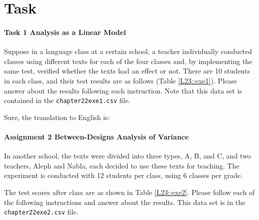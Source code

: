 \documentclass{ltjbook}
\begin{document}
\section{Task}
\paragraph{Task 1 Analysis as a Linear Model}
Suppose in a language class at a certain school, a teacher individually conducted classes using different texts for each of the four classes and, by implementing the same test, verified whether the texts had an effect or not.
There are 10 students in each class, and their test results are as follows (Table \ref{L23::exe1}). Please answer about the results following each instruction. Note that this data set is contained in the \texttt{chapter22exe1.csv} file.




Sure, the translation to English is:

\paragraph{Assignment 2 Between-Designs Analysis of Variance}
In another school, the texts were divided into three types, A, B, and C, and two teachers, Aleph and Nabla, each decided to use these texts for teaching. The experiment is conducted with 12 students per class, using 6 classes per grade.

The test scores after class are as shown in Table \ref{L23::exe2}. Please follow each of the following instructions and answer about the results. This data set is in the \texttt{chapter22exe2.csv} file.

\end{document}
